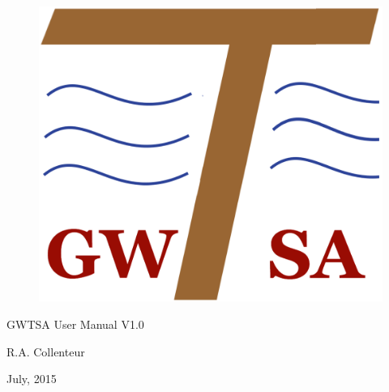 \begin{titlepage}

\vspace*{40pt}

\begin{figure}
	\centering
	\includegraphics[width=0.4\linewidth]{Logo}
\end{figure}


\begin{center}
	
{\huge GWTSA User Manual V1.0}

\bigskip
{\Large R.A. Collenteur}

\bigskip

{\large July, 2015}

\end{center}


\vspace*{\fill}

\end{titlepage}
